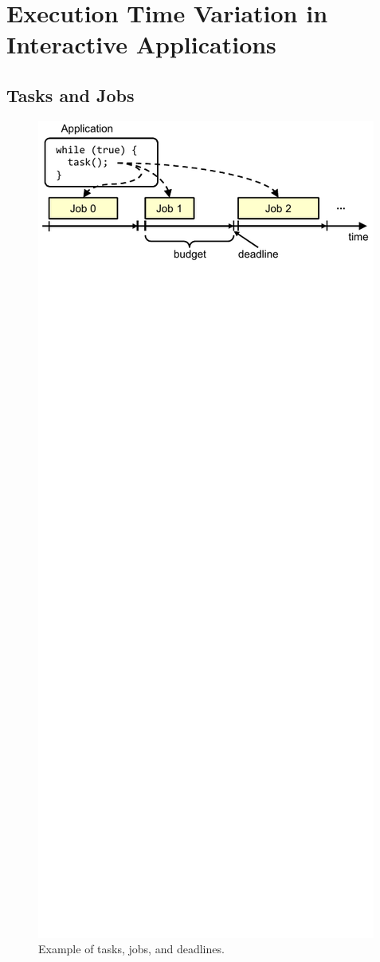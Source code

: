 \section{Execution Time Variation in Interactive Applications}
\label{sec:exec_time_prediction.applications}

\subsection{Tasks and Jobs}

\begin{figure}
  \begin{center}
    \includegraphics{exec_time_prediction/figs/jobs.pdf}
    \caption{Example of tasks, jobs, and deadlines.}
    \label{fig:exec_time_prediction.applications.jobs}
  \end{center}
\end{figure}

